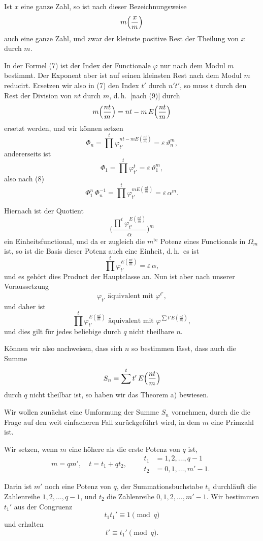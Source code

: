 \documentclass[12pt,a4paper]{article}
\begin{document}
Ist $x$ eine ganze Zahl, so ist nach dieser Bezeichnungsweise
\[
m\Bigl(\frac{x}{m}\Bigr)
\]
auch eine ganze Zahl, und zwar der kleinste positive Rest der Theilung von $x$ durch $m$.

In der Formel (7) ist der Index der Functionale $\varphi$ nur nach dem Modul $m$ bestimmt. Der Exponent aber ist auf seinen kleinsten Rest nach dem Modul $m$ reducirt. Ersetzen wir also in (7) den Index $t'$ durch $n't'$, so muss $t$ durch den Rest der Division von $nt$ durch $m$, d.\,h.\ [nach (9)] durch
\[
m\Bigl(\frac{nt}{m}\Bigr) = nt - m\,E\Bigl(\frac{nt}{m}\Bigr)
\]
ersetzt werden, und wir können setzen
\[
\Phi_n = \prod^t \varphi_{t'}^{nt - mE(\frac{nt}{m})} = \varepsilon\,\vartheta_n^m,
\]
andererseits ist
\[
\Phi_1 = \prod^t \varphi_{t'}^t = \varepsilon\,\vartheta_1^m,
\]
also nach (8)
\begin{equation}\label{eq:182-10}
\Phi_1^n\,\Phi_n^{-1} = \prod^t \varphi_{t'}^{mE(\frac{nt}{m})} = \varepsilon\,\alpha^m.
\end{equation}

Hiernach ist der Quotient
\[
\Biggl(\frac{\prod^t \varphi_{t'}^{E(\frac{nt}{m})}}{\alpha}\Biggr)^m
\]
ein Einheitsfunctional, und da er zugleich die $m^{\text{te}}$ Potenz eines Functionals in $\Omega_m$ ist, so ist die Basis dieser Potenz auch eine Einheit, d.\,h.\ es ist
\[
\prod^t \varphi_{t'}^{E(\frac{nt}{m})} = \varepsilon\,\alpha,
\]
und es gehört dies Product der Hauptclasse an. Nun ist aber nach unserer Voraussetzung
\[
\varphi_{t'} \text{ äquivalent mit } \varphi^{t'},
\]
und daher ist
\[
\prod^t \varphi_{t'}^{E(\frac{nt}{m})} \text{ äquivalent mit } \varphi^{\sum t'E(\frac{nt}{m})},
\]
und dies gilt für jedes beliebige durch $q$ nicht theilbare $n$.

Können wir also nachweisen, dass sich $n$ so bestimmen lässt, dass auch die Summe
\[
S_n = \sum^t t'\,E\Bigl(\frac{nt}{m}\Bigr)
\]
durch $q$ nicht theilbar ist, so haben wir das Theorem a) bewiesen.

Wir wollen zunächst eine Umformung der Summe $S_n$ vornehmen, durch die die Frage auf den weit einfacheren Fall zurückgeführt wird, in dem $m$ eine Primzahl ist.

Wir setzen, wenn $m$ eine höhere als die erste Potenz von $q$ ist,
\[
m = qm',\quad t = t_1 + qt_2,\qquad \begin{aligned} t_1 &= 1, 2, \ldots, q-1\\[-2pt] t_2 &= 0, 1, \ldots, m'-1.\end{aligned}
\]

Darin ist $m'$ noch eine Potenz von $q$, der Summationsbuchstabe $t_1$ durchläuft die Zahlenreihe $1, 2, \ldots, q-1$, und $t_2$ die Zahlenreihe $0, 1, 2, \ldots, m'-1$. Wir bestimmen $t_1'$ aus der Congruenz
\[
t_1 t_1' \equiv 1 \pmod{q}
\]
und erhalten
\[
t' \equiv t_1' \pmod{q}.
\]
\end{document}
